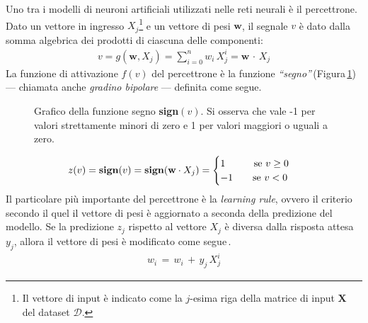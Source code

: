 Uno tra i modelli di neuroni artificiali utilizzati nelle reti neurali è il percettrone. Dato un vettore in ingresso $X_j$\footnote{Il vettore di input è indicato come la $j$-esima riga della matrice di input $\mathbf{X}$ del dataset $\mathcal{D}$.} e un vettore di pesi $\mathbf{w}$, il segnale $v$ è dato dalla somma algebrica dei prodotti di ciascuna delle componenti:
% 
\begin{gather*}
    v = g\left(\mathbf{w}, X_j\right) = \sum_{i = 0}^n w_i\,X_j^i = \mathbf{w} \, \cdot \,  X_j
\end{gather*}
% 
\noindent La funzione di attivazione $f(v)$ del percettrone è la funzione \textsl{``segno''}\,(Figura\,\ref{fig:sign-function}) — chiamata anche \textsl{gradino bipolare} — definita come segue. 
% 
\begin{figure}[!b]
    \centering
    
    \caption[Grafico della funzione segno \textsl{sign}$(v)$.]{Grafico della funzione segno \textbf{sign}$(v)$. Si osserva che vale -1 per valori strettamente minori di zero e 1 per valori maggiori o uguali a zero.}\label{fig:sign-function}
\end{figure}
% 
\begin{gather*}
    z(v) = \text{\textbf{sign}}(v) = \text{\textbf{sign}}(\mathbf{w} \cdot X_j) =
    \begin{cases}
        1 \hspace{29px} \text{se } v\geq0\\
        -1 \hspace{20px} \text{se } v<0
    \end{cases}
\end{gather*}
% 
\noindent Il particolare più importante del percettrone è la \textit{learning rule}, ovvero il criterio secondo il quel il vettore di pesi è aggiornato a seconda della predizione del modello. Se la predizione $z_j$ rispetto al vettore $X_j$ è diversa dalla risposta attesa $y_j$, allora il vettore di pesi è modificato come segue\,\cite{nielsen2015neural, flasinski2016introduction}.
% 
\begin{gather*}
    w_i \, = \, w_i \, + \, y_j\,X_j^i
\end{gather*}

